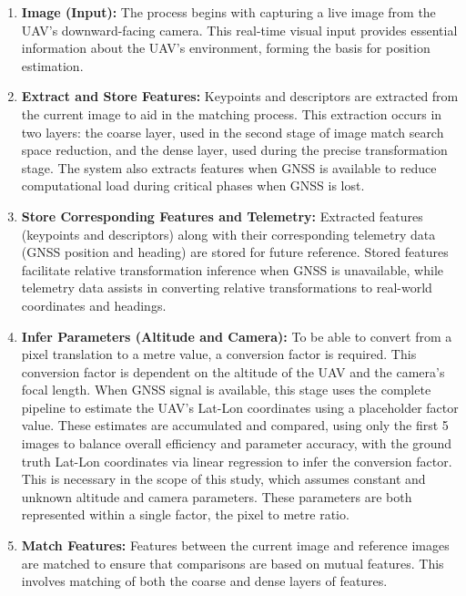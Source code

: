 \begin{enumerate}
    \item \textbf{Image (Input):}  
    The process begins with capturing a live image from the UAV’s downward-facing camera. This real-time visual input provides essential information about the UAV’s environment, forming the basis for position estimation.

    \item \textbf{Extract and Store Features:}  
    Keypoints and descriptors are extracted from the current image to aid in the matching process. This extraction occurs in two layers: the coarse layer, used in the second stage of image match search space reduction, and the dense layer, used during the precise transformation stage. The system also extracts features when GNSS is available to reduce computational load during critical phases when GNSS is lost.
    
    \item \textbf{Store Corresponding Features and Telemetry:}  
    Extracted features (keypoints and descriptors) along with their corresponding telemetry data (GNSS position and heading) are stored for future reference. Stored features facilitate relative transformation inference when GNSS is unavailable, while telemetry data assists in converting relative transformations to real-world coordinates and headings.

    \item \textbf{Infer Parameters (Altitude and Camera):}  
    To be able to convert from a pixel translation to a metre value, a conversion factor is required. This conversion factor is dependent on the altitude of the UAV and the camera's focal length. When GNSS signal is available, this stage uses the complete pipeline to estimate the UAV's Lat-Lon coordinates using a placeholder factor value. These estimates are accumulated and compared, using only the first 5 images to balance overall efficiency and parameter accuracy, with the ground truth Lat-Lon coordinates via linear regression to infer the conversion factor. This is necessary in the scope of this study, which assumes constant and unknown altitude and camera parameters. These parameters are both represented within a single factor, the pixel to metre ratio. 

    \item \textbf{Match Features:}  
    Features between the current image and reference images are matched to ensure that comparisons are based on mutual features. This involves matching of both the coarse and dense layers of features.


\end{enumerate}
